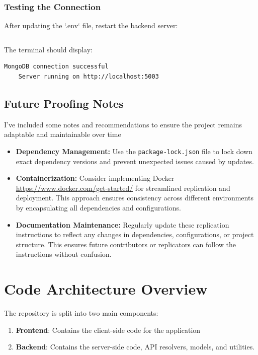 \documentclass[10pt,twocolumn]{article}
\begin{document}
\subsubsection{Testing the Connection}
After updating the `.env` file, restart the backend server:
\begin{lstlisting}[language=bash]
    % npm start
\end{lstlisting}
The terminal should display:
\begin{lstlisting}[language=bash]
    MongoDB connection successful
    Server running on http://localhost:5003
\end{lstlisting}

\subsection{Future Proofing Notes }
I've included some notes and recommendations to ensure the project remains adaptable and maintainable over time

\begin{itemize}
    \item \textbf{Dependency Management:} Use the \texttt{package-lock.json} file to lock down exact dependency versions and prevent unexpected issues caused by updates.
    \item \textbf{Containerization:} Consider implementing Docker \url{https://www.docker.com/get-started/} for streamlined replication and deployment. This approach ensures consistency across different environments by encapsulating all dependencies and configurations.
    \item \textbf{Documentation Maintenance:} Regularly update these replication instructions to reflect any changes in dependencies, configurations, or project structure. This ensures future contributors or replicators can follow the instructions without confusion.
\end{itemize}
\section{Code Architecture Overview} \label{Code-Arch}

The repository is split into two main components:
\begin{enumerate}
    \item \textbf{Frontend}: Contains the client-side code for the application
    \item \textbf{Backend}: Contains the server-side code, API resolvers, models, and utilities.
\end{enumerate}
\end{document}
